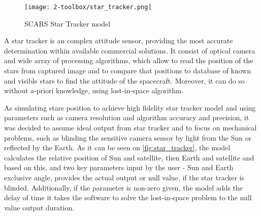         \begin{figure}[H]
            \centering
            \texttt{[image: 2-toolbox/star\_tracker.png]}
            \caption{SCARS Star Tracker model}
            \label{fig:star_tracker}
        \end{figure}

        A star tracker is an complex attitude sensor, providing the most accurate determination within available commercial solutions. It consist of optical camera and wide array of processing algorithms, which allow to read the position of the stars from captured image and to compare that positions to database of known and visible stars to find the attitude of the spacecraft. Moreover, it can do so without a-priori knowledge, using lost-in-space algorithm\cite{delabie2016star}.

        As simulating stars position to achieve high fidelity star tracker model and using parameters such as camera resolution and algorithm accuracy and precision, it was decided to assume ideal output from star tracker and to focus on mechanical problems, such as blinding the sensitive camera sensor by light from the Sun or reflected by the Earth. As it can be seen on \autoref{fig:star_tracker}, the model calculates the relative position of Sun and satellite, then Earth and satellite and based on this, and two key parameters input by the user - Sun and Earth exclusive angle, provides the actual output or null value, if the star tracker is blinded. Additionally, if the parameter is non-zero given, the model adds the delay of time it takes the software to solve the lost-in-space problem to the null value output duration.
